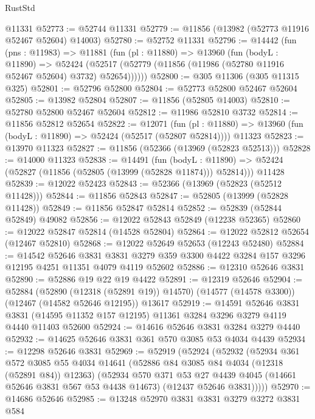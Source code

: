 \begin{lexlean}{RustStd}
\begin{coremodule}
    @11331
@52773 := @52744 @11331
@52779 := @11856 (@13982 (@52773 @11916 @52467 @52604) @14003)
@52780 := @52752 @11331
@52796 := @14442
    (fun (pns : @11983) =>
    @11881
      (fun (pl : @11880) =>
      @13960
        (fun (bodyL : @11890) =>
        @52424 (@52517 (@52779 (@11856 (@11986 (@52780 @11916 @52467 @52604) @3732) @52654))))))
@52800 := @305 @11306 (@305 @11315 @325)
@52801 := @52796 @52800
@52804 := @52773 @52800 @52467 @52604
@52805 := @13982 @52804
@52807 := @11856 (@52805 @14003)
@52810 := @52780 @52800 @52467 @52604
@52812 := @11986 @52810 @3732
@52814 := @11856 @52812 @52654
@52822 := @12071
    (fun (pl : @11880) => @13960 (fun (bodyL : @11890) => @52424 (@52517 (@52807 @52814))))
    @11323
@52823 := @13970 @11323
@52827 := @11856 (@52366 (@13969 (@52823 @52513)))
@52828 := @14000 @11323
@52838 := @14491
    (fun (bodyL : @11890) => @52424 (@52827 (@11856 (@52805 (@13999 (@52828 @11874))) @52814)))
    @11428
@52839 := @12022 @52423
@52843 := @52366 (@13969 (@52823 (@52512 @11428)))
@52844 := @11856 @52843
@52847 := @52805 (@13999 (@52828 @11428))
@52849 := @11856 @52847 @52814
@52852 := @52839 (@52844 @52849) @49082
@52856 := @12022 @52843 @52849 (@12238 @52365)
@52860 := @12022 @52847 @52814 (@14528 @52804)
@52864 := @12022 @52812 @52654 (@12467 @52810)
@52868 := @12022 @52649 @52653 (@12243 @52480)
@52884 := @14542
    @52646
    @3831
    @3831
    @3279
    @359
    @3300
    @4422
    @3284
    @157
    @3296
    @12195
    @4251
    @11351
    @4079
    @4119
    @52602
@52886 := @12310 @52646 @3831
@52890 := @52886 @19 @22 @19 @4422
@52891 := @12319 @52646
@52904 := @52884
    (@52890 (@12318 (@52891 @19)) @14570)
    (@14577 (@14578 @3300))
    (@12467 (@14582 @52646 @12195))
    @13617
@52919 := @14591
    @52646
    @3831
    @3831
    (@14595 @11352 @157 @12195)
    @11361
    @3284
    @3296
    @3279
    @4119
    @4440
    @11403
    @52600
@52924 := @14616 @52646 @3831 @3284 @3279 @4440
@52932 := @14625 @52646 @3831 @361 @570 @3085 @53 @4034 @4439
@52934 := @12298 @52646 @3831
@52969 := @52919
    (@52924
      (@52932
        (@52934
          @361
          @572
          @3085
          @55
          @4034
          @14641
          (@52886 @84 @3085 @84 @4034 (@12318 (@52891 @84)) @12363)
          (@52934
            @570
            @371
            @53
            @27
            @4439
            @4045
            (@14661 @52646 @3831 @567 @53 @4438 @14673)
            (@12437 @52646 @3831)))))
@52970 := @14686 @52646
@52985 := @13248
    @52970
    @3831
    @3831
    @3279
    @3272
    @3831
    @584

\end{coremodule}
\end{lexlean}
